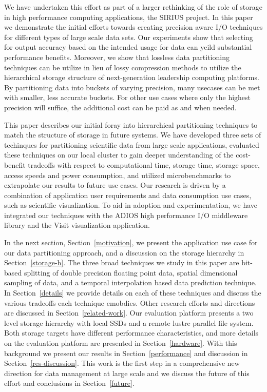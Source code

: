 \documentclass{sig-alt-gov2}
\begin{document}
We have undertaken this effort as part of a larger rethinking of the role of
storage in high performance computing applications, the SIRIUS project. In
this paper we demonstrate the initial efforts towards creating precision
aware I/O techniques for different types of large scale data sets. Our
experiments show that selecting for output accuracy based on the intended
usage for data can yeild substantial performance benefits. Moreover, we show
that lossless data partitioning techniques can be utilize in lieu of lossy
compression methods to utilize the hierarchical storage structure of
next-generation leadership computing platforms. By partitioning data into
buckets of varying precision, many usecases can be met with smaller, less
accurate buckets. For other use cases where only the highest precision will
suffice, the additional cost can be paid as and when needed.

This paper describes our initial foray into hierarchical partitioning techniques
to match the structure of storage in future systems. We have developed three
sets of techinques for partitioning scientific data from large scale
applications, evaluated these techniques on our local cluster to gain deeper
understanding of the cost-benefit tradeoffs with respect to computational time,
storage time, storage space, access speeds and power consumption, and utilized
microbenchmarks to extrapolate our results to future use cases. Our research is
driven by a combination of application user requirements and data consumption
use cases, such as scientific visualization. To aid in adoption and
experimentation, we have integrated our techniques with the ADIOS high
performance I/O middleware library and the Visit visualization application. 

In the next section, Section~\ref{motivation}, we present the application use
case for our data partitioning approach, and a discussion on the storage
hierarchy in Section~\ref{storage-h}. 
The three broad techniques we study in this paper are bit-based splitting of
double precision floating point data, spatial dimensional sampling of data, and
a temporal interpolation based data prediction technique. 
In
Section~\ref{details} we provide details on each of these techniques and discuss
the various tradeoffs each technique emobdies. Other research efforts and
directions are discussed in Section~\ref{related-work}. 
Our evaluation platform presents
a two level storage hierarchy with local SSDs and a remote lustre parallel file
system. Both storage targets have different performance characteristics, and
more details on the evaluation platform are presented in Section~\ref{hardware}. 
With this background we present our results in Section~\ref{performance} and
discussion in Section~\ref{res-discussion}. This work is the first step in a
comprehensive new direction for data management at large scale and we discuss
the future of this effort and conclusions in Section~\ref{future}. 
\end{document}
